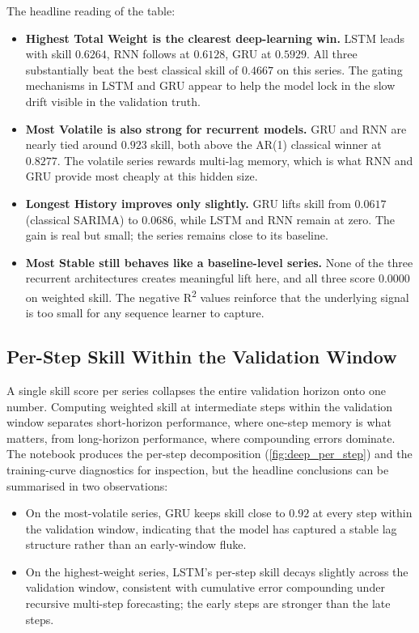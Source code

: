 The headline reading of the table:
\begin{itemize}
  \item \textbf{Highest Total Weight is the clearest deep-learning win.} LSTM leads with skill $0.6264$, RNN follows at $0.6128$, GRU at $0.5929$. All three substantially beat the best classical skill of $0.4667$ on this series. The gating mechanisms in LSTM and GRU appear to help the model lock in the slow drift visible in the validation truth.
  \item \textbf{Most Volatile is also strong for recurrent models.} GRU and RNN are nearly tied around $0.923$ skill, both above the AR(1) classical winner at $0.8277$. The volatile series rewards multi-lag memory, which is what RNN and GRU provide most cheaply at this hidden size.
  \item \textbf{Longest History improves only slightly.} GRU lifts skill from $0.0617$ (classical SARIMA) to $0.0686$, while LSTM and RNN remain at zero. The gain is real but small; the series remains close to its baseline.
  \item \textbf{Most Stable still behaves like a baseline-level series.} None of the three recurrent architectures creates meaningful lift here, and all three score $0.0000$ on weighted skill. The negative R\textsuperscript{2} values reinforce that the underlying signal is too small for any sequence learner to capture.
\end{itemize}

\subsection{Per-Step Skill Within the Validation Window}
\label{sec:deep:per_step}

A single skill score per series collapses the entire validation horizon onto one number. Computing weighted skill at intermediate steps within the validation window separates short-horizon performance, where one-step memory is what matters, from long-horizon performance, where compounding errors dominate. The notebook produces the per-step decomposition (\cref{fig:deep_per_step}) and the training-curve diagnostics for inspection, but the headline conclusions can be summarised in two observations:

\begin{itemize}
  \item On the most-volatile series, GRU keeps skill close to $0.92$ at every step within the validation window, indicating that the model has captured a stable lag structure rather than an early-window fluke.
  \item On the highest-weight series, LSTM's per-step skill decays slightly across the validation window, consistent with cumulative error compounding under recursive multi-step forecasting; the early steps are stronger than the late steps.
\end{itemize}

